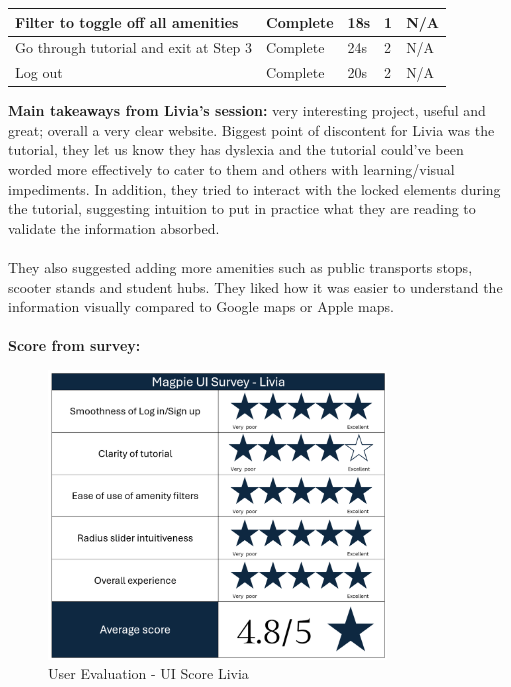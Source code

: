 \begin{table}[h!]
\begin{tabular}{|p{}|p{}|p{}|p{}|p{}|}
        \hline
        Filter to toggle off all amenities            & Complete        & 18s                 & 1                   & N/A             \\
        \hline
        Go through tutorial and exit at Step 3        & Complete        & 24s                 & 2                   & N/A             \\
        \hline
        Log out                                       & Complete        & 20s                 & 2                   & N/A             \\
        \hline
    \end{tabular}
\end{table}
\textbf{Main takeaways from Livia's session: }very interesting project, useful and great; overall a very clear website. Biggest point of discontent for Livia was the tutorial, they let us know they has dyslexia and the tutorial could've been worded more effectively to cater to them and others with learning/visual impediments. In addition, they tried to interact with the locked elements during the tutorial, suggesting intuition to put in practice what they are reading to validate the information absorbed.\\\\
They also suggested adding more amenities such as public transports stops, scooter stands and student hubs. They liked how it was easier to understand the information visually compared to Google maps or Apple maps.\\\\
\textbf{Score from survey: }
\begin{figure}
    \centering
    \includegraphics[width=0.8\textwidth]{images/survey-livia.png}
    \caption{User Evaluation - UI Score Livia}
\end{figure}

